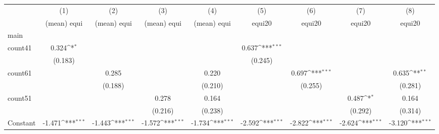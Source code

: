 {
\def\sym#1{\ifmmode^{#1}\else\(^{#1}\)\fi}
\begin{tabular}{l*{8}{c}}
\hline\hline
                    &\multicolumn{1}{c}{(1)}&\multicolumn{1}{c}{(2)}&\multicolumn{1}{c}{(3)}&\multicolumn{1}{c}{(4)}&\multicolumn{1}{c}{(5)}&\multicolumn{1}{c}{(6)}&\multicolumn{1}{c}{(7)}&\multicolumn{1}{c}{(8)}\\
                    &\multicolumn{1}{c}{(mean) equi}&\multicolumn{1}{c}{(mean) equi}&\multicolumn{1}{c}{(mean) equi}&\multicolumn{1}{c}{(mean) equi}&\multicolumn{1}{c}{equi20}&\multicolumn{1}{c}{equi20}&\multicolumn{1}{c}{equi20}&\multicolumn{1}{c}{equi20}\\
\hline
main                &                     &                     &                     &                     &                     &                     &                     &                     \\
count41             &       0.324\sym{*}  &                     &                     &                     &       0.637\sym{***}&                     &                     &                     \\
                    &     (0.183)         &                     &                     &                     &     (0.245)         &                     &                     &                     \\
[1em]
count61             &                     &       0.285         &                     &       0.220         &                     &       0.697\sym{***}&                     &       0.635\sym{**} \\
                    &                     &     (0.188)         &                     &     (0.210)         &                     &     (0.255)         &                     &     (0.281)         \\
[1em]
count51             &                     &                     &       0.278         &       0.164         &                     &                     &       0.487\sym{*}  &       0.164         \\
                    &                     &                     &     (0.216)         &     (0.238)         &                     &                     &     (0.292)         &     (0.314)         \\
[1em]
Constant            &      -1.471\sym{***}&      -1.443\sym{***}&      -1.572\sym{***}&      -1.734\sym{***}&      -2.592\sym{***}&      -2.822\sym{***}&      -2.624\sym{***}&      -3.120\sym{***}\\

\end{tabular}}

